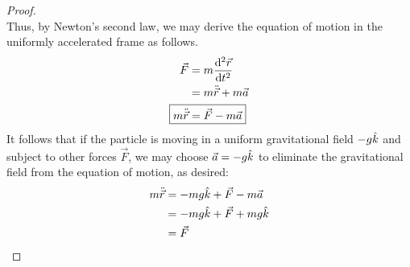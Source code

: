 \documentclass[../psets.tex]{subfiles}
\begin{document}
\begin{enumerate}
\begin{proof}
\begin{equation*}
        \end{equation*}
        Thus, by Newton's second law, we may derive the equation of motion in the uniformly accelerated frame as follows.
        \begin{align*}
            \vec{F} &= m\dv[2]{\vec{r}}{t}\\
            &= m\ddot{\vec{r}}+m\vec{a}\\
            \Aboxed{m\ddot{\vec{r}} &= \vec{F}-m\vec{a}}
        \end{align*}
        It follows that if the particle is moving in a uniform gravitational field $-g\hat{k}$ and subject to other forces $\vec{F}$, we may choose $\vec{a}=-g\hat{k}$ to eliminate the gravitational field from the equation of motion, as desired:
        \begin{align*}
            m\ddot{\vec{r}} &= -mg\hat{k}+\vec{F}-m\vec{a}\\
            &= -mg\hat{k}+\vec{F}+mg\hat{k}\\
            &= \vec{F}
        \end{align*}
    \end{proof}
\end{enumerate}
\end{document}
